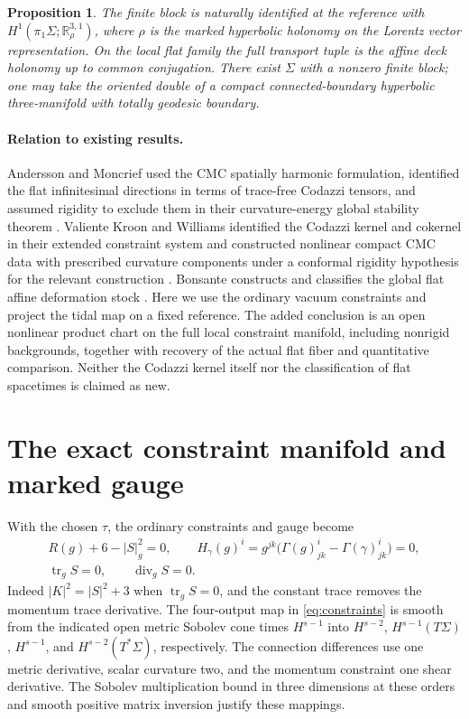 \documentclass[11pt]{article}
\newtheorem{proposition}[theorem]{Proposition}
\theoremstyle{remark}
\newcommand{\tr}{\operatorname{tr}}
\newcommand{\divg}{\operatorname{div}}
\newcommand{\Mink}{\mathbb R^{3,1}}
\begin{document}
\begin{proposition}\label{prop:attainment}
The finite block is naturally identified at the reference with
\(H^1(\pi_1\Sigma;\Mink_\rho)\), where \(\rho\) is the marked hyperbolic holonomy on the Lorentz vector representation. On the local flat family the full transport tuple is the affine deck holonomy up to common conjugation. There exist \(\Sigma\) with a nonzero finite block; one may take the oriented double of a compact connected-boundary hyperbolic three-manifold with totally geodesic boundary.
\end{proposition}

\paragraph{Relation to existing results.}
Andersson and Moncrief used the CMC spatially harmonic formulation, identified the flat infinitesimal directions in terms of trace-free Codazzi tensors, and assumed rigidity to exclude them in their curvature-energy global stability theorem \cite[Lemma~2.5, Definition~2.6 and Appendix~A]{AMfuture}. Valiente Kroon and Williams identified the Codazzi kernel and cokernel in their extended constraint system and constructed nonlinear compact CMC data with prescribed curvature components under a conformal rigidity hypothesis for the relevant construction \cite[Sections~3.4 and~4]{VKW}. Bonsante constructs and classifies the global flat affine deformation stock \cite{Bonsante}. Here we use the ordinary vacuum constraints and project the tidal map on a fixed reference. The added conclusion is an open nonlinear product chart on the full local constraint manifold, including nonrigid backgrounds, together with recovery of the actual flat fiber and quantitative comparison. Neither the Codazzi kernel itself nor the classification of flat spacetimes is claimed as new.

\section{The exact constraint manifold and marked gauge}\label{sec:gauge}

With the chosen \(\tau\), the ordinary constraints and gauge become
\begin{align}
 R(g)+6-|S|_g^2=0,\qquad
 H_\gamma(g)^i=g^{jk}\bigl(\Gamma(g)^i_{jk}-\Gamma(\gamma)^i_{jk}\bigr)=0,
 \nonumber\\
 \tr_gS=0,\qquad \divg_gS=0 .
 \label{eq:constraints}
\end{align}
Indeed \(|K|^2=|S|^2+3\) when \(\tr_gS=0\), and the constant trace removes the momentum trace derivative. The four-output map in \eqref{eq:constraints} is smooth from the indicated open metric Sobolev cone times \(H^{s-1}\) into \(H^{s-2}\), \(H^{s-1}(T\Sigma)\), \(H^{s-1}\), and \(H^{s-2}(T^*\Sigma)\), respectively. The connection differences use one metric derivative, scalar curvature two, and the momentum constraint one shear derivative. The Sobolev multiplication bound in three dimensions at these orders and smooth positive matrix inversion justify these mappings.
\end{document}
